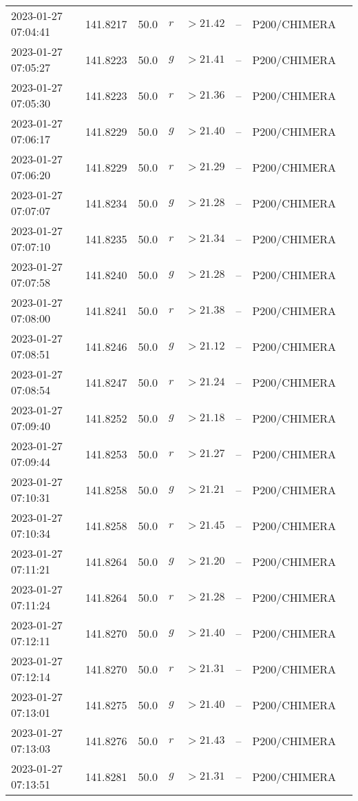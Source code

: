 \documentclass{nature_plusfigure}
\begin{document}
\begin{supplement}
\begin{center}
\begin{longtable}{llllllll}
2023-01-27 07:04:41 & 141.8217 & 50.0 & $r$ & $>21.42$ & -- & P200/CHIMERA &  \\ 
2023-01-27 07:05:27 & 141.8223 & 50.0 & $g$ & $>21.41$ & -- & P200/CHIMERA &  \\ 
2023-01-27 07:05:30 & 141.8223 & 50.0 & $r$ & $>21.36$ & -- & P200/CHIMERA &  \\ 
2023-01-27 07:06:17 & 141.8229 & 50.0 & $g$ & $>21.40$ & -- & P200/CHIMERA &  \\ 
2023-01-27 07:06:20 & 141.8229 & 50.0 & $r$ & $>21.29$ & -- & P200/CHIMERA &  \\ 
2023-01-27 07:07:07 & 141.8234 & 50.0 & $g$ & $>21.28$ & -- & P200/CHIMERA &  \\ 
2023-01-27 07:07:10 & 141.8235 & 50.0 & $r$ & $>21.34$ & -- & P200/CHIMERA &  \\ 
2023-01-27 07:07:58 & 141.8240 & 50.0 & $g$ & $>21.28$ & -- & P200/CHIMERA &  \\ 
2023-01-27 07:08:00 & 141.8241 & 50.0 & $r$ & $>21.38$ & -- & P200/CHIMERA &  \\ 
2023-01-27 07:08:51 & 141.8246 & 50.0 & $g$ & $>21.12$ & -- & P200/CHIMERA &  \\ 
2023-01-27 07:08:54 & 141.8247 & 50.0 & $r$ & $>21.24$ & -- & P200/CHIMERA &  \\ 
2023-01-27 07:09:40 & 141.8252 & 50.0 & $g$ & $>21.18$ & -- & P200/CHIMERA &  \\ 
2023-01-27 07:09:44 & 141.8253 & 50.0 & $r$ & $>21.27$ & -- & P200/CHIMERA &  \\ 
2023-01-27 07:10:31 & 141.8258 & 50.0 & $g$ & $>21.21$ & -- & P200/CHIMERA &  \\ 
2023-01-27 07:10:34 & 141.8258 & 50.0 & $r$ & $>21.45$ & -- & P200/CHIMERA &  \\ 
2023-01-27 07:11:21 & 141.8264 & 50.0 & $g$ & $>21.20$ & -- & P200/CHIMERA &  \\ 
2023-01-27 07:11:24 & 141.8264 & 50.0 & $r$ & $>21.28$ & -- & P200/CHIMERA &  \\ 
2023-01-27 07:12:11 & 141.8270 & 50.0 & $g$ & $>21.40$ & -- & P200/CHIMERA &  \\ 
2023-01-27 07:12:14 & 141.8270 & 50.0 & $r$ & $>21.31$ & -- & P200/CHIMERA &  \\ 
2023-01-27 07:13:01 & 141.8275 & 50.0 & $g$ & $>21.40$ & -- & P200/CHIMERA &  \\ 
2023-01-27 07:13:03 & 141.8276 & 50.0 & $r$ & $>21.43$ & -- & P200/CHIMERA &  \\ 
2023-01-27 07:13:51 & 141.8281 & 50.0 & $g$ & $>21.31$ & -- & P200/CHIMERA &  \\ 

\end{longtable}
\end{center}
\end{supplement}
\end{document}
